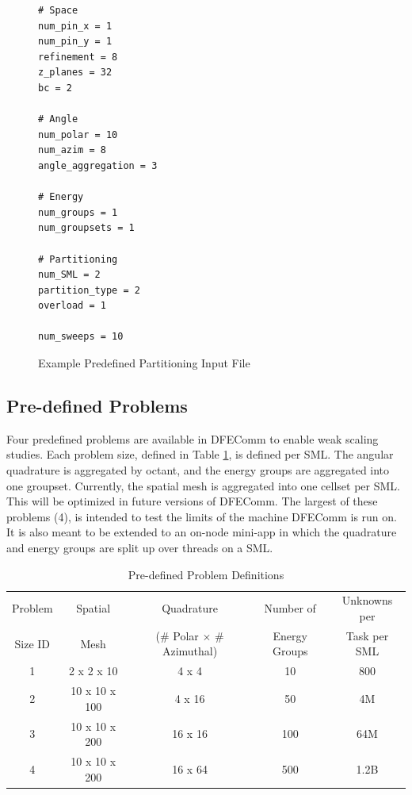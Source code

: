 \documentclass{article}
\begin{document}
\begin{figure}[htbp]
\begin{verbatim}
# Space
num_pin_x = 1
num_pin_y = 1
refinement = 8
z_planes = 32
bc = 2

# Angle
num_polar = 10
num_azim = 8
angle_aggregation = 3

# Energy
num_groups = 1
num_groupsets = 1
  	
# Partitioning
num_SML = 2
partition_type = 2	
overload = 1

num_sweeps = 10
 \end{verbatim}  
    \caption[]{Example Predefined Partitioning Input File}\label{fig::partition}
\end{figure}

\subsection{Pre-defined Problems} \label{probdef}
Four predefined problems are available in DFEComm to enable weak scaling studies. Each problem size, defined in Table \ref{table::probsize}, is defined per SML. The angular quadrature is aggregated by octant, and the energy groups are aggregated into one groupset. Currently, the spatial mesh is aggregated into one cellset per SML. This will be optimized in future versions of DFEComm. The largest of these problems (4), is intended to test the limits of the machine DFEComm is run on. It is also meant to be extended to an on-node mini-app in which the quadrature and energy groups are split up over threads on a SML.\\ \newline

\begin{table}[H]
\begin{center}
  \begin{tabular}{ |c| c | c|c| c|}
    \hline
    Problem & Spatial & Quadrature& Number of & Unknowns per \\ 
    Size ID & Mesh& (\# Polar $\times$ \# Azimuthal) &  Energy Groups & Task per SML\\
    \hline
    1 & 2 x 2 x 10 & 4 x 4 & 10 & 800\\ 
    2 & 10 x 10 x 100 & 4 x 16 & 50& 4M\\
    3 & 10 x 10 x 200& 16 x 16 & 100& 64M \\
    4 & 10 x 10 x 200& 16 x 64 & 500 & 1.2B \\
    \hline
  \end{tabular} 
      \caption{Pre-defined Problem Definitions}
      \label{table::probsize}
\end{center}
\end{table}
\end{document}

